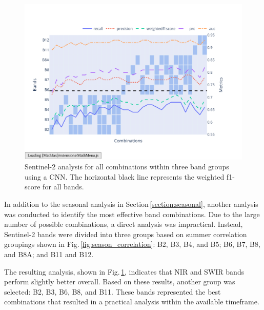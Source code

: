 \begin{figure}[ht]
    \centering
    \includegraphics[width=0.98\linewidth, trim={20pt 40pt 10pt 30pt}, clip]{figures/figures_analysis/band_selection.pdf}
    \caption{Sentinel-2 analysis for all combinations within three band groups using a CNN. The horizontal black line represents the weighted f1-score for all bands.}
    \label{fig:band_selection}
\end{figure}

In addition to the seasonal analysis in Section\,\ref{section:seasonal}, another analysis was conducted to identify the most effective band combinations. Due to the large number of possible combinations, a direct analysis was impractical. Instead, Sentinel-2 bands were divided into three groups based on summer correlation groupings shown in Fig.\,\ref{fig:season_correlation}: B2, B3, B4, and B5; B6, B7, B8, and B8A; and B11 and B12. 

The resulting analysis, shown in Fig.\,\ref{fig:band_selection}, indicates that NIR and SWIR bands perform slightly better overall. Based on these results, another group was selected: B2, B3, B6, B8, and B11. These bands represented the best combinations that resulted in a practical analysis within the available timeframe.

